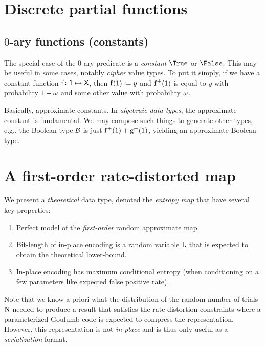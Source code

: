 \documentclass[11pt,final,hidelinks]{article}
\begin{document}
\providecommand{\mainx}{..}
\section{Discrete partial functions}

\subsection{$0$-ary functions (constants)}
The special case of the $0$-ary predicate is a \emph{constant} $\True$ or $\False$.
This may be useful in some cases, notably \emph{cipher} value types.
To put it simply, if we have a constant function $\Fun{f} \colon \Set{1} \mapsto \Set{X}$, then $\Fun{f}(1) \coloneqq y$ and $\APFun{f}(1)$ is equal to $y$ with probability $1-\omega$ and some other value with probability $\omega$.

Basically, approximate constants.
In \emph{algebraic data types}, the approximate constant is fundamental.
We may compose such things to generate other types, e.g., the Boolean type $\BitSet$ is just $\APFun{f}(1) + \APFun{g}(1)$, yielding an approximate Boolean type.

%
\providecommand{\mainx}{..}
\section{A first-order rate-distorted map}
We present a \emph{theoretical} data type, denoted the \emph{entropy map} that have several key properties:
\begin{enumerate}
\item Perfect model of the \emph{first-order} random approximate map.
\item Bit-length of in-place encoding is a random variable $\mathrm{L}$ that is expected to obtain the theoretical lower-bound.
\item In-place encoding has maximum conditional entropy (when conditioning on a few parameters like expected false positive rate).
\end{enumerate}
Note that we know a priori what the distribution of the random number of trials $\mathrm{N}$ needed to produce a result that satisfies the rate-distortion constraints where a parameterized Goulumb code is expected to compress the representation.
However, this representation is not \emph{in-place} and is thus only useful as a \emph{serialization} format.
\end{document}
